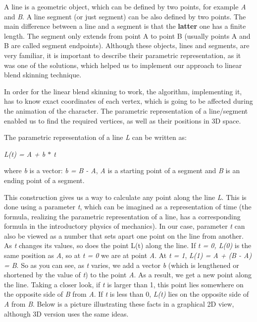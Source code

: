\documentclass[times, 10pt,twocolumn]{article}
\begin{document}
A line is a geometric object, which can be defined by two points, for example \emph{A} and \emph{B}. A line segment (or just segment) can be also defined by two points. The main difference between a line and a segment is that the \textbf{latter} one has a finite length. The segment only extends from point A to point B (usually points A and B are called segment endpoints). Although these objects, lines and segments, are very familiar, it is important to describe their parametric representation, as it was one of the solutions, which helped us to implement our approach to linear blend skinning technique.

In order for the linear blend skinning to work, the algorithm, implementing it, has to know exact coordinates of each vertex, which is going to be affected during the animation of the character. The parametric representation of a line/segment enabled us to find the required vertices, as well as their positions in 3D space.

The parametric representation of a line \emph{L} can be written as:
\begin{center}
\emph{L(t) = A + b $\ast$ t}
\end{center}
where \emph{b} is a vector: \emph{b = B - A}, \emph{A} is a starting point of a segment and \emph{B} is an ending point of a segment.

This construction gives us a way to calculate any point along the line \emph{L}. This is done using a parameter \emph{t}, which can be imagined as a representation of time (the formula, realizing the parametric representation of a line, has a corresponding formula in the introductory physics of mechanics). In our case, parameter \emph{t} can also be viewed as a number  that sets apart one point on the line from another. As \emph{t} changes its values, so does the point L(t)  along the line.
If \emph{t = 0, L(0)} is the same position as \emph{A}, so at \emph{t = 0} we are at point \emph{A}. At \emph{t = 1},  \emph{L(1) = A + (B - A) = B}. So as you can see, as \emph{t} varies, we add a vector \emph{b} (which is lengthened or shortened by the value of \emph{t}) to the point \emph{A}. As a result, we get a new point along the line. Taking a closer look, if \emph{t} is larger than 1, this point lies somewhere on the opposite side of \emph{B} from \emph{A}. If \emph{t} is less than 0, \emph{L(t)} lies on the opposite side of \emph{A} from \emph{B}. Below is a picture \label{line_in_space} illustrating these facts in a graphical 2D view, although 3D version uses the same ideas.
\end{document}
